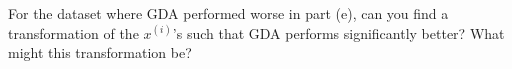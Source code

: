 \item {} For the dataset where GDA performed worse in
part (e), can you find a transformation of the $x^{(i)}$'s such
that GDA performs significantly better? What might this transformation be?

